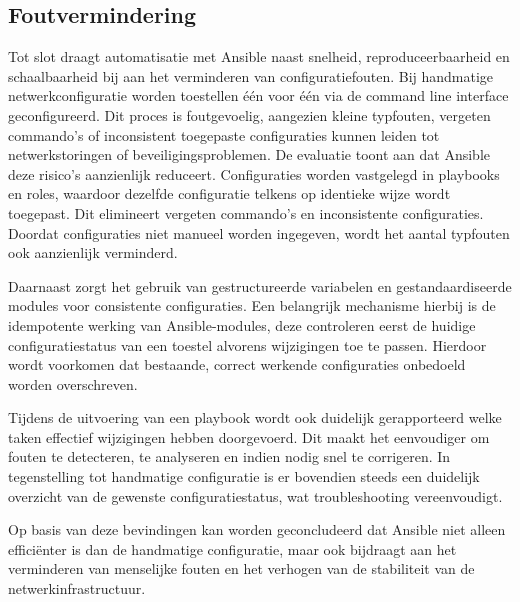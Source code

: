 \subsection{Foutvermindering}
Tot slot draagt automatisatie met Ansible naast snelheid, reproduceerbaarheid en schaalbaarheid bij aan het verminderen van configuratiefouten.
Bij handmatige netwerkconfiguratie worden toestellen één voor één via de command line interface geconfigureerd.
Dit proces is foutgevoelig, aangezien kleine typfouten, vergeten commando's of inconsistent toegepaste configuraties kunnen leiden tot netwerkstoringen of beveiligingsproblemen.
De evaluatie toont aan dat Ansible deze risico's aanzienlijk reduceert.
Configuraties worden vastgelegd in playbooks en roles, waardoor dezelfde configuratie telkens op identieke wijze wordt toegepast. Dit elimineert vergeten commando's en inconsistente configuraties.
Doordat configuraties niet manueel worden ingegeven, wordt het aantal typfouten ook aanzienlijk verminderd.
\vspace{1em}

Daarnaast zorgt het gebruik van gestructureerde variabelen en gestandaardiseerde modules voor consistente configuraties.
Een belangrijk mechanisme hierbij is de idempotente werking van Ansible-modules, deze controleren eerst de huidige configuratiestatus van een toestel alvorens wijzigingen toe te passen.
Hierdoor wordt voorkomen dat bestaande, correct werkende configuraties onbedoeld worden overschreven.
\vspace{1em}

Tijdens de uitvoering van een playbook wordt ook duidelijk gerapporteerd welke taken effectief wijzigingen hebben doorgevoerd.
Dit maakt het eenvoudiger om fouten te detecteren, te analyseren en indien nodig snel te corrigeren.
In tegenstelling tot handmatige configuratie is er bovendien steeds een duidelijk overzicht van de gewenste configuratiestatus, wat troubleshooting vereenvoudigt.
\vspace{1em}

Op basis van deze bevindingen kan worden geconcludeerd dat Ansible niet alleen efficiënter is dan de handmatige configuratie, maar ook bijdraagt aan het verminderen van menselijke fouten en het verhogen van de stabiliteit van de netwerkinfrastructuur.
\vspace{1em}